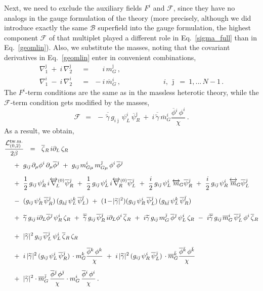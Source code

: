 \documentclass[12pt]{article}
\def\beq{\begin{equation}}
\def\eeq{\end{equation}}
\newcommand{\p}{\partial}
\newcommand{\wt}{\widetilde}
\newcommand{\ov}{\overline}
\newcommand{\mc}[1]{\mathcal{#1}}
\newcommand{\bzr}{\ov{\zeta}{}_R}
\newcommand{\zr}{\zeta_R}
\newcommand{\tgamma}{\wt{\gamma}}
\newcommand{\btgamma}{\ov{\tgamma}}
\newcommand{\bpsi}{\ov{\psi}{}}
\newcommand{\bphi}{\ov{\phi}{}}
\newcommand{\ff}{\mc{F}}
\newcommand{\bj}{{\bar \jmath}}
\newcommand{\bk}{{\bar k}}
\newcommand{\bl}{{\bar l}}
\begin{document}
Next, we need to exclude the auxiliary fields $ F^i $ and $ \ff $, since they have no analogs
	in the gauge formulation of the theory 
	(more precisely, although we did introduce  exactly the same $\mc{B}$ superfield into the gauge formulation, 
	the highest component $\ff$ of that multiplet played a different role in Eq.~\eqref{sigma_full} than in Eq.~\eqref{geomlin}).
	Also, we substitute the masses, noting that the covariant derivatives in Eq.~\eqref{geomlin} 
	enter in convenient combinations, 
\begin{align*}
%
	\nabla_1^\bj ~+~ i\,\nabla_2^\bj & ~~=~~ \phantom{-} i\,m_G^\bj\,,    \\[2mm]
%
	\nabla_1^i ~-~ i\,\nabla_2^i     & ~~=~~ -i\,\ov{m}{}_G^i\,,
	\qquad\qquad\qquad i,\,\bj ~=~ 1,...\,N-1\,.
\end{align*}
The $ F^i $-term conditions are the same as in the massless heterotic theory, while the $ \ff $-term condition
	gets modified by the masses,
\beq
\label{ffterm}
	\ff ~~=~~ -\, \btgamma\, g_{i\bj}\, \psi_L^i\, \bpsi_R^\bj
	      ~+~ i\, \btgamma\, \ov{m}_G^i \frac{\bphi^i\, \phi^i}{\chi}\,.
\eeq
	As a result, we obtain, 
\begin{align}
%
\notag
	\frac{\mc{L}_{(0,2)}^\text{tw.m.}}{2\beta} & ~~=~~ 
	\bzr\, i\p_L\, \zr \\[1mm]
%
\notag
	&\!\!\!\!\!\!\!\!\!\!\!\!
	~+~ g_{i\bj}\, \p_\mu\phi^i\, \p_\mu\bphi^\bj ~+~ g_{i\bj}\, m_{G\mu}^i\,m_{G\mu}^\bj\, \phi^i\, \bphi^\bj
	\\[2mm]
%
\notag
	&\!\!\!\!\!\!\!\!\!\!\!\!
	~+~ \frac{1}{2}\,g_{i\bj}\,\psi_R^i\,i\overleftrightarrow{\nabla}{}_{\!\!L}^{(0)} \bpsi_R^\bj 
	~+~ \frac{1}{2}\,g_{i\bj}\,\psi_L^i\,i\overleftrightarrow{\nabla}{}_{\!\!R}^{(0)} \bpsi_L^\bj 
	~+~ \frac{i}{2}\,g_{i\bj}\,\psi_L^i\, \overleftrightarrow{m}{}_{\!G} \bpsi_R^\bj
	~+~ \frac{i}{2}\,g_{i\bj}\,\psi_R^i\, \overleftrightarrow{\ov{m}}{}_{\!G} \bpsi_L^\bj
	\\[2mm]
%
\label{sgeom_phys}
	&\!\!\!\!\!\!\!\!\!\!\!\!
	~-~ (g_{i\bj}\, \psi_R^i\, \bpsi_R^\bj)\,(g_{k\bl}\, \psi_L^k\, \bpsi_L^\bl) 
	~+~ (1 \!-\!|\tgamma|^2)(g_{i\bj}\, \psi_R^i\, \bpsi_L^\bj)\,(g_{k\bl}\,\psi_L^k\,\bpsi_R^\bl)
	\\[3mm]
%
\notag
	&\!\!\!\!\!\!\!\!\!\!\!\!
	~+~ \tgamma\, g_{i\bj}\, i\p_L\bphi^\bj\, \psi_R^i\,\zr 
	~+~ \btgamma\, g_{i\bj}\, \bpsi_R^\bj\, i\p_L\phi^i\, \bzr
	~+~ i\tgamma\, g_{i\bj}\, m_G^\bj\,\bphi^\bj\, \psi_L^i\,\zr
	~-~ i\btgamma\, g_{i\bj}\,\ov{m}{}_G^i\, \bpsi_L^\bj\, \phi^i\,\bzr
	\\[4mm]
%
\notag
	&\!\!\!\!\!\!\!\!\!\!\!\!
	~+~ |\tgamma|^2\, g_{i\bj}\, \bpsi_L^\bj\, \psi_L^i\, \bzr\, \zr
	\\[2mm]
%
\notag
	&\!\!\!\!\!\!\!\!\!\!\!\!
	~+~ i\, |\tgamma|^2\, (g_{i\bj}\,\psi_L^i\,\bpsi_R^\bj)\, \cdot m_G^k \frac{\bphi^k\, \phi^k}{\chi}
	~+~ i\, |\tgamma|^2\, (g_{i\bj}\,\psi_R^i\,\bpsi_L^\bj)\, \cdot \ov{m}{}_G^\bk \frac{\bphi^\bk\,\phi^\bk}{\chi}
	\\[2mm]
%
\notag
	&\!\!\!\!\!\!\!\!\!\!\!\!
	~+~ |\tgamma|^2 \cdot \ov{m}{}_G^\bj\,\frac{\bphi^\bj\,\phi^\bj}{\chi}
			\cdot m_G^i\, \frac{\bphi^i\, \phi^i}{\chi}\,.
\end{align}
\end{document}
